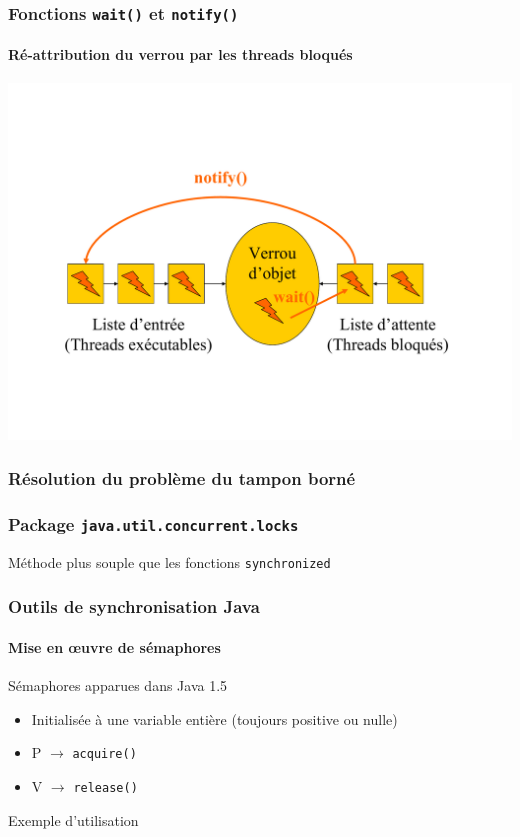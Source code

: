 \begin{frame}
\frametitle{Fonctions \texttt{wait()} et \texttt{notify()}}
\framesubtitle{Ré-attribution du verrou par les threads bloqués}
\includegraphics[width=.9\textwidth]{../illustration/methode_synchronized_notif.pdf}
\end{frame}

\begin{frame}
\frametitle{Résolution du problème du tampon borné}
\begin{scriptsize}\end{scriptsize}
\end{frame}

\begin{frame}
\frametitle{Package \texttt{java.util.concurrent.locks}}
\begin{scriptsize}

\end{scriptsize}
\begin{center}
Méthode plus souple que les fonctions \texttt{synchronized}
\end{center}
\end{frame}

\begin{frame}
\frametitle{Outils de synchronisation Java}
\framesubtitle{Mise en œuvre de sémaphores}
Sémaphores apparues dans Java 1.5
\begin{itemize}
\item Initialisée à une variable entière (toujours positive ou nulle)
\item P $\rightarrow$ \texttt{acquire()}
\item V $\rightarrow$ \texttt{release()}
\end{itemize}
\begin{exampleblock}{Exemple d'utilisation}
\begin{scriptsize}
 
\end{scriptsize}
\end{exampleblock}

\end{frame}

